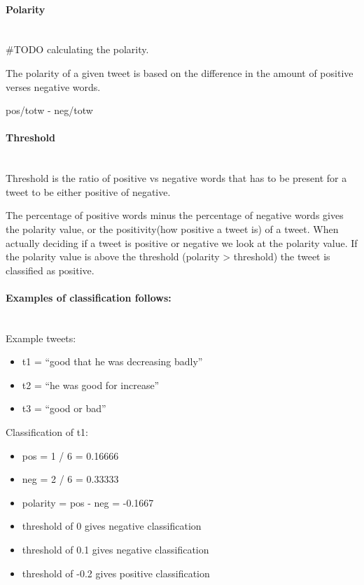 \paragraph{Polarity} 
\hspace{0pt}\\ 
#TODO calculating the polarity.  

The polarity of a given tweet is based on the difference in the amount of
positive verses negative words.

pos/totw - neg/totw 

\paragraph{Threshold} 
\hspace{0pt}\\ 
Threshold is the ratio of positive vs negative words that has to be present for a
tweet to be either positive of negative.

The percentage of positive words minus the percentage of negative words gives
the polarity value, or the positivity(how positive a tweet is) of a tweet. 
When actually deciding if a tweet is positive or negative we look at the
polarity value. If the polarity value is above the threshold (polarity >
threshold) the tweet is classified as positive. 

\paragraph{Examples of classification follows:} 
\hspace{0pt}\\ 
Example tweets:
\begin{itemize}
    \item t1 = “good that he was decreasing badly”
    \item t2 = “he was good for increase” 
    \item t3 = “good or bad”
\end{itemize}

Classification of t1:
\begin{itemize}
    \item pos = 1 / 6 = 0.16666
    \item neg = 2 / 6 = 0.33333
    \item polarity = pos - neg = -0.1667
    \item threshold of 0 gives negative classification
    \item threshold of 0.1 gives negative classification
    \item threshold of -0.2 gives positive classification
\end{itemize}

